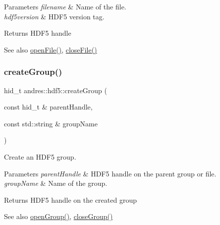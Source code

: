 \begin{DoxyParams}{Parameters}
{\em filename} & Name of the file. \\
\hline
{\em hdf5version} & H\+D\+F5 version tag.\\
\hline
\end{DoxyParams}
\begin{DoxyReturn}{Returns}
H\+D\+F5 handle
\end{DoxyReturn}
\begin{DoxySeeAlso}{See also}
\hyperlink{namespaceandres_1_1hdf5_a3645de3466468274059f8475066ff820}{open\+File()}, \hyperlink{namespaceandres_1_1hdf5_afa6545825e5557eecf6ac1e8fc68bb56}{close\+File()} 
\end{DoxySeeAlso}
\mbox{\label{namespaceandres_1_1hdf5_ac03dd5212231c5335a0a02edb3c0d879}} 
\subsubsection{\texorpdfstring{create\+Group()}{createGroup()}}
{\footnotesize\ttfamily hid\+\_\+t andres\+::hdf5\+::create\+Group (\begin{DoxyParamCaption}\item[{const hid\+\_\+t \&}]{parent\+Handle,  }\item[{const std\+::string \&}]{group\+Name }\end{DoxyParamCaption})\hspace{0.3cm}{\ttfamily [inline]}}

Create an H\+D\+F5 group.


\begin{DoxyParams}{Parameters}
{\em parent\+Handle} & H\+D\+F5 handle on the parent group or file. \\
\hline
{\em group\+Name} & Name of the group. \\
\hline
\end{DoxyParams}
\begin{DoxyReturn}{Returns}
H\+D\+F5 handle on the created group
\end{DoxyReturn}
\begin{DoxySeeAlso}{See also}
\hyperlink{namespaceandres_1_1hdf5_a3d7159f65f86576c9142409b08afcfc9}{open\+Group()}, \hyperlink{namespaceandres_1_1hdf5_a1aaf506863ec820cdcc827c7997d4ba3}{close\+Group()} 
\end{DoxySeeAlso}
\mbox{\label{namespaceandres_1_1hdf5_ad5975e294df6102c312f69cd69e43d60}} 
